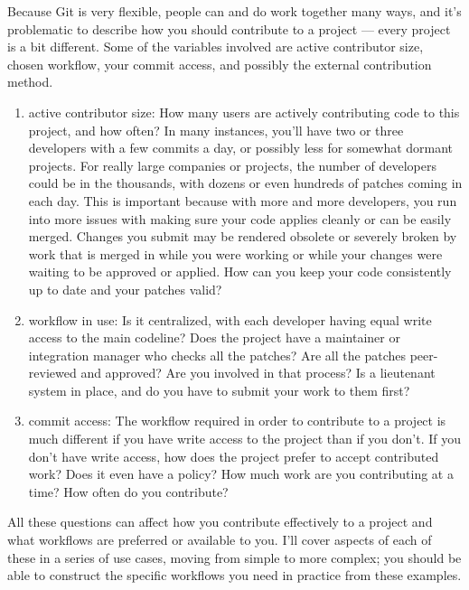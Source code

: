 \documentclass[draftclsnofoot,journal,onecolumn,12pt]{IEEEtran}
\begin{document}
Because Git is very flexible, people can and do work together many ways, and it’s problematic to describe how you should contribute to a project — every project is a bit different. Some of the variables involved are active contributor size, chosen workflow, your commit access, and possibly the external contribution method.
\begin{enumerate}
  \item active contributor size: How many users are actively contributing code to this project, and how often? In many instances, you’ll have two or three developers with a few commits a day, or possibly less for somewhat dormant projects. For really large companies or projects, the number of developers could be in the thousands, with dozens or even hundreds of patches coming in each day. This is important because with more and more developers, you run into more issues with making sure your code applies cleanly or can be easily merged. Changes you submit may be rendered obsolete or severely broken by work that is merged in while you were working or while your changes were waiting to be approved or applied. How can you keep your code consistently up to date and your patches valid?
  \item workflow in use: Is it centralized, with each developer having equal write access to the main codeline? Does the project have a maintainer or integration manager who checks all the patches? Are all the patches peer-reviewed and approved? Are you involved in that process? Is a lieutenant system in place, and do you have to submit your work to them first?
  \item commit access: The workflow required in order to contribute to a project is much different if you have write access to the project than if you don’t. If you don’t have write access, how does the project prefer to accept contributed work? Does it even have a policy? How much work are you contributing at a time? How often do you contribute?
\end{enumerate}

All these questions can affect how you contribute effectively to a project and what workflows are preferred or available to you. I’ll cover aspects of each of these in a series of use cases, moving from simple to more complex; you should be able to construct the specific workflows you need in practice from these examples.
\end{document}
